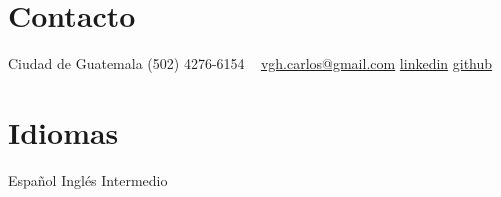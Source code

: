 \documentclass[]{friggeri-cv} %
\begin{document}


\begin{aside} %
\section{Contacto}
Ciudad de Guatemala
 (502) 4276-6154
~
\href{mailto:vgh.carlos@gmail.com}{vgh.carlos@gmail.com}
\href{https://www.linkedin.com/pub/carlos-hern\%C3\%A1ndez/87/1b1/157}{linkedin}
\href{https://github.com/learnercys}{github}
\section{Idiomas}
Español
Inglés Intermedio 
\end{aside}

\end{document}
